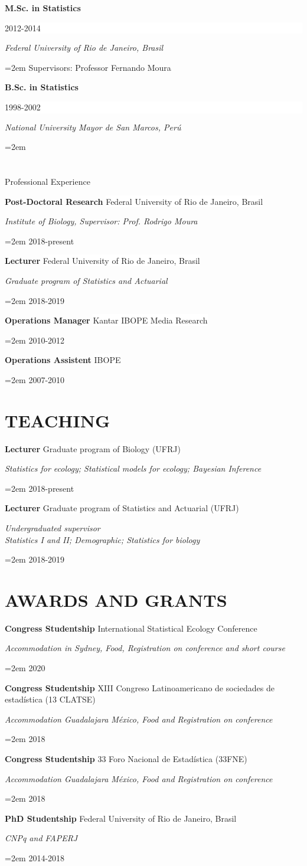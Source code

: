 \documentclass[paper=a4,fontsize=11pt]{scrartcl}	 			%
\renewcommand{\refname}{PUBLICATIONS}
\newcommand{\sepspace}{\vspace*{1em}}			%
\newcommand{\NewPart}[1]{\section*{\uppercase{#1}}}
\newcommand{\EducationEntry}[4]{
		\noindent \textbf{#1} \hfill 					%
		\colorbox{White}{%
			\parbox{10em}{%
			\hfill\color{Black}#2}} \par				%
		\noindent \textit{#3} \par					%
		\noindent\hangindent=2em\hangafter=0 \small #4 	%
		\normalsize \par}
\newcommand{\WorkEntry}[4]{						%
		\noindent \textbf{#1} \hfill 					%
		\colorbox{White}{\color{Black}#2} \par		%
		\noindent \textit{#3} \par					%
		\noindent\hangindent=2em\hangafter=0 \small #4 	%
		\normalsize \par}
\begin{document}
\EducationEntry{M.Sc. in Statistics}{2012-2014}{Federal University of Rio de Janeiro, Brasil}{Supervisors: Professor Fernando Moura}
\sepspace

\EducationEntry{B.Sc. in Statistics}{1998-2002}{National University Mayor de San Marcos, Per\'{u}}

\NewPart{Professional Experience}{}

\WorkEntry{Post-Doctoral Research}{Federal University of Rio de Janeiro, Brasil}{Institute of Biology, Supervisor: Prof. Rodrigo Moura}{2018-present}
\sepspace

\WorkEntry{Lecturer}{Federal University of Rio de Janeiro, Brasil}{Graduate program of Statistics and Actuarial}{2018-2019}
\sepspace

\WorkEntry{Operations Manager}{Kantar IBOPE Media Research}{}{2010-2012}
\sepspace

\WorkEntry{Operations Assistent}{IBOPE}{}{2007-2010}
\sepspace



%
\nocite{*}




\NewPart{Teaching}{}
\WorkEntry{Lecturer}{Graduate  program of Biology (UFRJ) }{Statistics for ecology; Statistical models for ecology; Bayesian Inference}{2018-present}
\sepspace

\WorkEntry{Lecturer}{Graduate  program of Statistics and Actuarial (UFRJ) }{Undergraduated supervisor \\ Statistics I and II; Demographic; Statistics for biology}{2018-2019}
\sepspace


\NewPart{Awards and Grants}{}

\WorkEntry{Congress Studentship}{International Statistical Ecology Conference }{Accommodation in Sydney,	Food, Registration on conference and short course}{2020}

\WorkEntry{Congress Studentship}{XIII Congreso Latinoamericano de sociedades de estadística (13 CLATSE)}{Accommodation Guadalajara México,
	Food and Registration on conference}{2018}

\WorkEntry{Congress Studentship}{33 Foro Nacional de Estadística (33FNE)}{Accommodation Guadalajara México,
	Food and Registration on conference}{2018}

\WorkEntry{PhD Studentship}{Federal University of Rio de Janeiro, Brasil}{CNPq and FAPERJ}{2014-2018}
\sepspace
\end{document}
